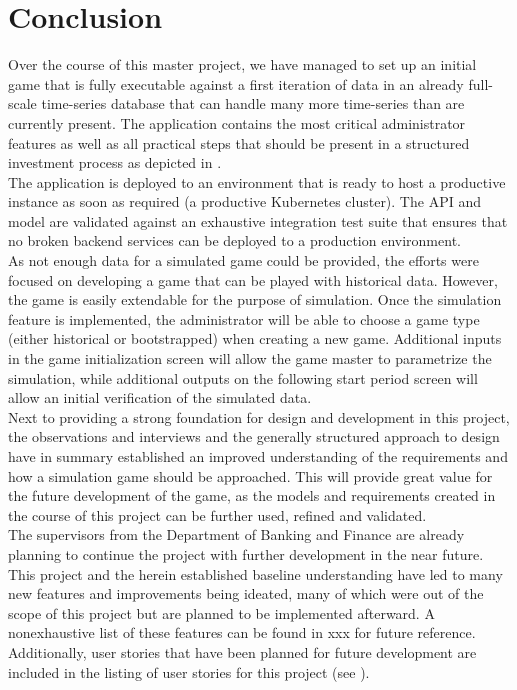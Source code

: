 \section{Conclusion}
\label{sec:conclusion}
Over the course of this master project, we have managed to set up an initial game that is fully executable against a first iteration of data in an already full-scale time-series database that can handle many more time-series than are currently present. The application contains the most critical administrator features as well as all practical steps that should be present in a structured investment process as depicted in . \\

The application is deployed to an environment that is ready to host a productive instance as soon as required (a productive Kubernetes cluster). The API and model are validated against an exhaustive integration test suite that ensures that no broken backend services can be deployed to a production environment. \\

As not enough data for a simulated game could be provided, the efforts were focused on developing a game that can be played with historical data. However, the game is easily extendable for the purpose of simulation. Once the simulation feature is implemented, the administrator will be able to choose a game type (either historical or bootstrapped) when creating a new game. Additional inputs in the game initialization screen will allow the game master to parametrize the simulation, while additional outputs on the following start period screen will allow an initial verification of the simulated data. \\

Next to providing a strong foundation for design and development in this project, the observations and interviews and the generally structured approach to design have in summary established an improved understanding of the requirements and how a simulation game should be approached. This will provide great value for the future development of the game, as the models and requirements created in the course of this project can be further used, refined and validated. \\

The supervisors from the Department of Banking and Finance are already planning to continue the project with further development in the near future. This project and the herein established baseline understanding have led to many new features and improvements being ideated, many of which were out of the scope of this project but are planned to be implemented afterward. A nonexhaustive list of these features can be found in xxx for future reference. Additionally, user stories that have been planned for future development are included in the listing of user stories for this project (see ). \\

